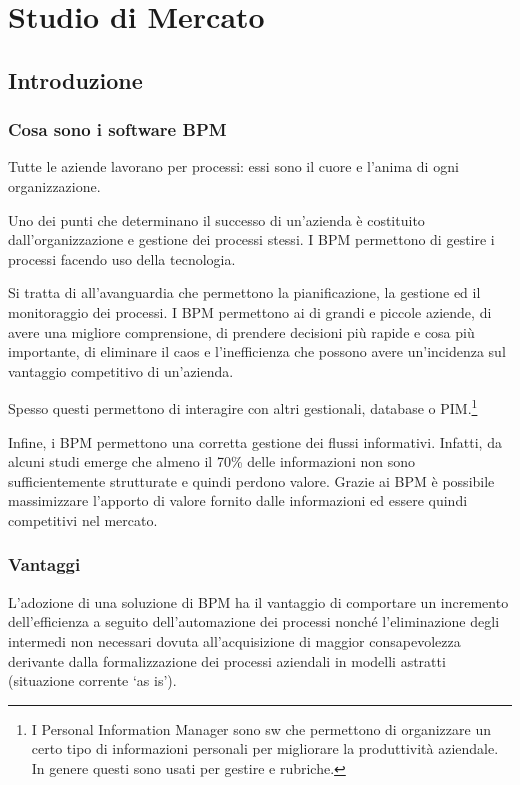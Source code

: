 \chapter{Studio di Mercato}
\section{Introduzione}
\subsection{Cosa sono i software BPM}
	
Tutte le aziende lavorano per processi: essi sono il cuore e l'anima di ogni organizzazione.
		
Uno dei punti che determinano il successo di un'azienda è costituito dall'organizzazione e gestione dei processi stessi. I \sw BPM permettono di gestire i processi facendo uso della tecnologia. 
		
Si tratta di \sw all'avanguardia che permettono la pianificazione, la gestione ed il monitoraggio dei processi.
I \sw BPM permettono  ai  di grandi e piccole aziende, di avere una migliore comprensione, di prendere decisioni più rapide e cosa più importante, di eliminare il caos e l'inefficienza che possono avere un'incidenza sul vantaggio competitivo di un'azienda.

Spesso questi \sw permettono di interagire con altri \sw gestionali, database o PIM\@.\footnote{ I Personal Information Manager sono sw che permettono di organizzare un certo tipo di informazioni personali per migliorare la produttività aziendale. In genere questi \sw sono usati per gestire  e rubriche.}

Infine, i \sw BPM permettono una corretta gestione dei flussi informativi. Infatti, da alcuni studi emerge che almeno il 70\% delle informazioni non sono sufficientemente strutturate e quindi perdono valore. Grazie ai \sw BPM è possibile massimizzare l'apporto di valore fornito dalle informazioni ed essere quindi competitivi nel mercato.

\subsection{Vantaggi}
L'adozione di una soluzione di BPM ha il vantaggio di comportare un incremento dell'efficienza a seguito dell'automazione dei processi nonché l'eliminazione degli  intermedi non necessari dovuta all'acquisizione di maggior consapevolezza derivante dalla formalizzazione dei processi aziendali in modelli astratti (situazione corrente `as is').

